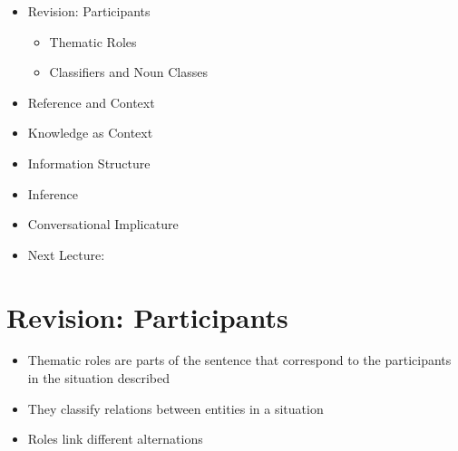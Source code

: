 \documentclass[headrule,footrule]{foils}
\begin{document}
\maketitle



\begin{itemize}\addtolength{\itemsep}{-1ex}
\item Revision: Participants
  \begin{itemize}
  \item Thematic Roles
  \item Classifiers and Noun Classes
  \end{itemize}
  \item Reference and Context
  \item Knowledge as Context
  \item Information Structure
  \item Inference
  \item Conversational Implicature
  \item Next Lecture: 
\end{itemize}




\section{Revision: Participants}


\begin{itemize}
\item  Thematic roles are parts of the sentence that 
correspond to the participants in the situation 
described
\item  They classify relations between entities in a situation

\item  Roles link different alternations
\begin{exe}
  \ex {}
  \ex {}
\end{exe}
\end{itemize}
\end{document}
